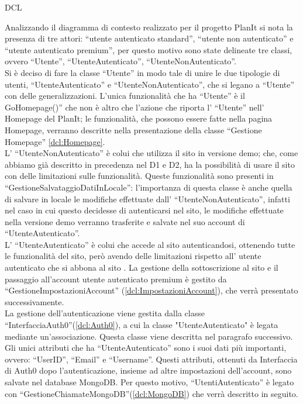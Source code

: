 \begin{listaPersonale}{DCL}

    Analizzando il diagramma di contesto realizzato per il progetto PlanIt si nota la presenza di tre attori: “utente autenticato standard”, “utente non autenticato” e “utente autenticato premium”, per questo motivo sono state delineate tre classi, ovvero “Utente”, “UtenteAutenticato”, “UtenteNonAutenticato”.\\
    Si è deciso di fare la classe “Utente” in modo tale di unire le due tipologie di utenti, “UtenteAutenticato” e “UtenteNonAutenticato”, che si legano a “Utente” con delle generalizzazioni. L'unica funzionalità che ha “Utente” è il GoHomepage()” che non è altro che l'azione che riporta l' “Utente” nell' Homepage del PlanIt; le funzionalità, che possono essere fatte nella pagina Homepage, verranno descritte nella presentazione della classe “Gestione Homepage” \ref{dcl:Homepage}.\\
    L' “UtenteNonAutenticato” è colui che utilizza il sito in versione demo; che, come abbiamo già descritto in precedenza nel D1 e D2, ha la possibilità di usare il sito con delle limitazioni sulle funzionalità. Queste funzionalità sono presenti in “GestioneSalvataggioDatiInLocale”: l'importanza di questa classe è anche quella di salvare in locale le modifiche effettuate dall' “UtenteNonAutenticato”, infatti nel caso in cui questo decidesse di autenticarsi nel sito, le modifiche effettuate nella versione demo verranno trasferite e salvate nel suo account di “UtenteAutenticato”.\\
    L' “UtenteAutenticato” è colui che accede al sito autenticandosi, ottenendo tutte le funzionalità del sito, però avendo delle limitazioni rispetto all' utente autenticato che si abbona al sito . La gestione della sottoscrizione al sito e il passaggio all'account utente autenticato premium è gestito da “GestioneImpostazioniAccount” (\ref{dcl:ImpostazioniAccount}), che verrà presentato successivamente.\\
    La gestione dell'autenticazione viene gestita dalla classe “InterfacciaAuth0”(\ref{dcl:Auth0}), a cui la classe "UtenteAutenticato" è legata mediante un'associazione. Questa classe viene descritta nel paragrafo successivo. Gli unici attributi che ha “UtenteAutenticato” sono i suoi dati più importanti, ovvero: “UserID”, “Email” e “Username”. Questi attributi, ottenuti da Interfaccia di Auth0 dopo l'autenticazione, insieme ad altre impostazioni dell'account, sono salvate nel database MongoDB. Per questo motivo, “UtentiAutenticato” è legato con “GestioneChiamateMongoDB”(\ref{dcl:MongoDB}) che verrà descritto in seguito.


\end{listaPersonale}
